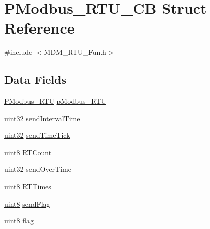 \hypertarget{struct_p_modbus___r_t_u___c_b}{}\section{P\+Modbus\+\_\+\+R\+T\+U\+\_\+\+CB Struct Reference}
\label{struct_p_modbus___r_t_u___c_b}


{\ttfamily \#include $<$M\+D\+M\+\_\+\+R\+T\+U\+\_\+\+Fun.\+h$>$}

\subsection*{Data Fields}
\begin{DoxyCompactItemize}
\item 
\mbox{\hyperlink{struct_p_modbus___r_t_u}{P\+Modbus\+\_\+\+R\+TU}} \mbox{\hyperlink{struct_p_modbus___r_t_u___c_b_adb544f6aebd1657c4c501fc6242f882a}{p\+Modbus\+\_\+\+R\+TU}}
\item 
\mbox{\hyperlink{_m_d___r_t_u___type_8h_a1134b580f8da4de94ca6b1de4d37975e}{uint32}} \mbox{\hyperlink{struct_p_modbus___r_t_u___c_b_a737171dd633a7c2cb6220dbeeb1d63f1}{send\+Interval\+Time}}
\item 
\mbox{\hyperlink{_m_d___r_t_u___type_8h_a1134b580f8da4de94ca6b1de4d37975e}{uint32}} \mbox{\hyperlink{struct_p_modbus___r_t_u___c_b_a01142fa006a4422cbaa461d855616d9d}{send\+Time\+Tick}}
\item 
\mbox{\hyperlink{_m_d___r_t_u___type_8h_adde6aaee8457bee49c2a92621fe22b79}{uint8}} \mbox{\hyperlink{struct_p_modbus___r_t_u___c_b_aae77144fa6798e3e1ce54874162f92a3}{R\+T\+Count}}
\item 
\mbox{\hyperlink{_m_d___r_t_u___type_8h_a1134b580f8da4de94ca6b1de4d37975e}{uint32}} \mbox{\hyperlink{struct_p_modbus___r_t_u___c_b_a79e974b421cddf0344cf7212de2eaf76}{send\+Over\+Time}}
\item 
\mbox{\hyperlink{_m_d___r_t_u___type_8h_adde6aaee8457bee49c2a92621fe22b79}{uint8}} \mbox{\hyperlink{struct_p_modbus___r_t_u___c_b_af3e577c29495ae2d3a8d1e02817852cb}{R\+T\+Times}}
\item 
\mbox{\hyperlink{_m_d___r_t_u___type_8h_adde6aaee8457bee49c2a92621fe22b79}{uint8}} \mbox{\hyperlink{struct_p_modbus___r_t_u___c_b_ac4d23072e5df9294849fc921ac87dac4}{send\+Flag}}
\item 
\mbox{\hyperlink{_m_d___r_t_u___type_8h_adde6aaee8457bee49c2a92621fe22b79}{uint8}} \mbox{\hyperlink{struct_p_modbus___r_t_u___c_b_af11e40d15a1361229a78e772af5b3c94}{flag}}
\end{DoxyCompactItemize}


